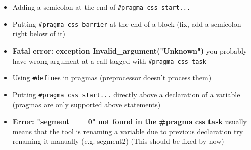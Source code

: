 \documentclass[letterpaper]{article}
\begin{document}
\begin{itemize}
  \item Adding a semicolon at the end of \verb!#pragma css start...!
  \item Putting \verb!#pragma css barrier! at the end of a block (fix, add a semicolon right below of it)
  \item \textbf{{Fatal error: exception Invalid\_argument("Unknown")}} you
      probably have wrong argument at a call tagged with \verb!#pragma css task!
  \item Using \verb!#define!s in pragmas (preprocessor doesn't process them)
  \item Putting \verb!#pragma css start...! directly above a declaration of a variable (pragmas are only supported above statements)
  \item \textbf{Error: "segment\_\_\_0" not found in the \#pragma css task} 
  usually means that the tool is renaming a variable due to previous declaration
  try renaming it manually (e.g. segment2) (This should be fixed by now)
\end{itemize}
\end{document}
